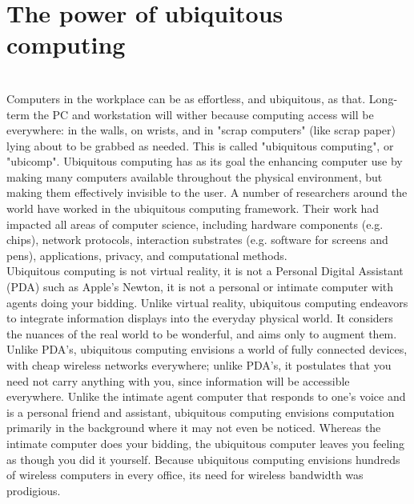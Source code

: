 \documentclass[12pt]{report}
\begin{document}
\section{The power of ubiquitous computing }\\
\hspace*{0.5in}Computers in the workplace can be as effortless, and ubiquitous, as that. Long-term the PC and workstation will wither because computing access will be everywhere: in the walls, on wrists, and in "scrap computers" (like scrap paper) lying about to be grabbed as needed. This is called "ubiquitous computing", or "ubicomp". Ubiquitous computing has as its goal the enhancing computer use by making many computers available throughout the physical environment, but making them effectively invisible to the user. A number of researchers around the world have worked in the ubiquitous computing framework. Their work had impacted all areas of computer science, including hardware components (e.g. chips), network protocols, interaction substrates (e.g. software for screens and pens), applications, privacy, and computational methods.
\\\hspace*{0.5in}Ubiquitous computing is not virtual reality, it is not a Personal Digital Assistant (PDA) such as Apple's Newton, it is not a personal or intimate computer with agents doing your bidding. Unlike virtual reality, ubiquitous computing endeavors to integrate information displays into the everyday physical world. It considers the nuances of the real world to be wonderful, and aims only to augment them. Unlike PDA's, ubiquitous computing envisions a world of fully connected devices, with cheap wireless networks everywhere; unlike PDA's, it postulates that you need not carry anything with you, since information will be accessible everywhere. Unlike the intimate agent computer that responds to one's voice and is a personal friend and assistant, ubiquitous computing envisions computation primarily in the background where it may not even be noticed. Whereas the intimate computer does your bidding, the ubiquitous computer leaves you feeling as though you did it yourself. Because ubiquitous computing envisions hundreds of wireless computers in every office, its need for wireless bandwidth was prodigious.
\end{document}
